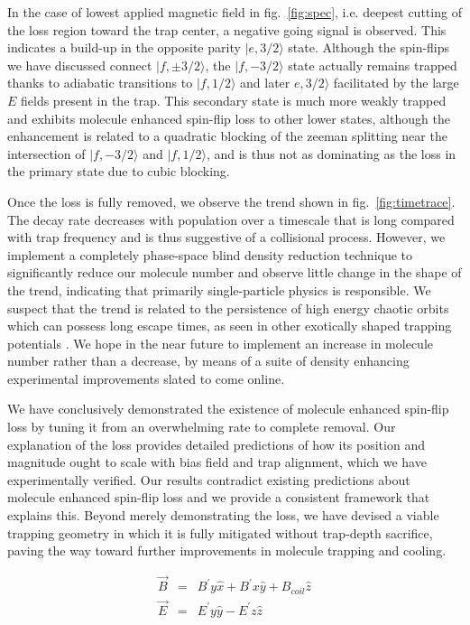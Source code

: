 \documentclass[%
 reprint,
 amsmath,amssymb,
 aps,
prl,
]{revtex4-1}
\begin{document}
In the case of lowest applied magnetic field in fig.~\ref{fig:spec}, i.e. deepest cutting of the loss region toward the trap center, a negative going signal is observed. This indicates a build-up in the opposite parity $|e,3/2\rangle$ state. Although the spin-flips we have discussed connect $|f,\pm3/2\rangle$, the $|f,-3/2\rangle$ state actually remains trapped thanks to adiabatic transitions to $|f,1/2\rangle$ and later $e,3/2\rangle$ facilitated by the large $E$ fields present in the trap. This secondary state is much more weakly trapped and exhibits molecule enhanced spin-flip loss to other lower states, although the enhancement is related to a quadratic blocking of the zeeman splitting near the intersection of $|f,-3/2\rangle$ and $|f,1/2\rangle$, and is thus not as dominating as the loss in the primary state due to cubic blocking.

Once the loss is fully removed, we observe the trend shown in fig.~\ref{fig:timetrace}. The decay rate decreases with population over a timescale that is long compared with trap frequency and is thus suggestive of a collisional process. However, we implement a completely phase-space blind density reduction technique to significantly reduce our molecule number and observe little change in the shape of the trend, indicating that primarily single-particle physics is responsible. We suspect that the trend is related to the persistence of high energy chaotic orbits which can possess long escape times, as seen in other exotically shaped trapping potentials \cite{Gonzalez-Ferez2014}. We hope in the near future to implement an increase in molecule number rather than a decrease, by means of a suite of density enhancing experimental improvements slated to come online.

We have conclusively demonstrated the existence of molecule enhanced spin-flip loss by tuning it from an overwhelming rate to complete removal. Our explanation of the loss provides detailed predictions of how its position and magnitude ought to scale with bias field and trap alignment, which we have experimentally verified. Our results contradict existing predictions about molecule enhanced spin-flip loss and we provide a consistent framework that explains this. Beyond merely demonstrating the loss, we have devised a viable trapping geometry in which it is fully mitigated without trap-depth sacrifice, paving the way toward further improvements in molecule trapping and cooling.

\begin{eqnarray}
\vec{B} &=&  B^\prime y\hat{x}+ B^\prime x\hat{y} + B_{coil} \hat{z}\\
\vec{E} &=&  E^\prime y\hat{y}-  E^\prime z\hat{z}
\end{eqnarray}
\end{document}
